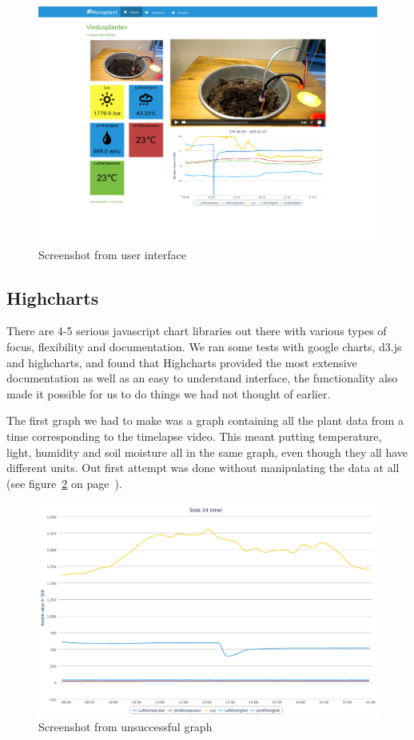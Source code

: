 \begin{figure}
\centering
\includegraphics[width=1\textwidth]{img/interface/mainpage.png}
\caption{Screenshot from user interface}
\label{fig:mainpage}
\end{figure}

\subsection{Highcharts}
There are 4-5 serious javascript chart libraries out there with various types of focus, flexibility and documentation. We ran some tests with google charts, d3.js and highcharts, and found that Highcharts provided the most extensive documentation as well as an easy to understand interface, the functionality also made it possible for us to do things we had not thought of earlier.

The first graph we had to make was a graph containing all the plant data from a time corresponding to the timelapse video. This meant putting temperature, light, humidity and soil moisture all in the same graph, even though they all have different units. Out first attempt was done without manipulating the data at all (see figure~\ref{fig:badgraph} on page~\pageref{fig:badgraph}). 

\begin{figure}
\centering
\includegraphics[width=1\textwidth]{img/interface/badgraph.png}
\caption{Screenshot from unsuccessful graph}
\label{fig:badgraph}
\end{figure}

